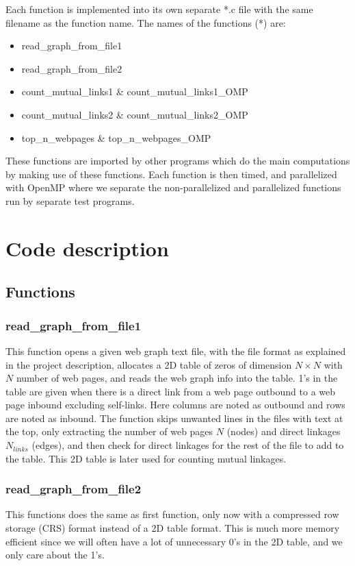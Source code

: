 \documentclass[12pt,a4paper,english]{article}
\begin{document}
Each function is implemented into its own separate *.c file with the same filename as the function name. The names of the functions (*) are:
\begin{itemize}
	\item read\_graph\_from\_file1
	\item read\_graph\_from\_file2
	\item count\_mutual\_links1 \& count\_mutual\_links1\_OMP
	\item count\_mutual\_links2 \& count\_mutual\_links2\_OMP
	\item top\_n\_webpages \& top\_n\_webpages\_OMP
\end{itemize}
These functions are imported by other programs which do the main computations by making use of these functions. Each function is then timed, and parallelized with OpenMP where we separate the non-parallelized and parallelized functions run by separate test programs.

\section{Code description}
\label{sect:Code_descr}
\subsection{Functions}
\label{subsect:Functions}
\subsubsection{read\_graph\_from\_file1}
This function opens a given web graph text file, with the file format as explained in the project description, allocates a 2D table of zeros of dimension $N\times N$ with $N$ number of web pages, and reads the web graph info into the table. 1's in the table are given when there is a direct link from a web page outbound to a web page inbound excluding self-links. Here columns are noted as outbound and rows are noted as inbound. The function skips unwanted lines in the files with text at the top, only extracting the number of web pages $N$ (nodes) and direct linkages $N_{links}$ (edges), and then check for direct linkages for the rest of the file to add to the table. This 2D table is later used for counting mutual linkages.

\subsubsection{read\_graph\_from\_file2}
This functions does the same as first function, only now with a compressed row storage (CRS) format instead of a 2D table format. This is much more memory efficient since we will often have a lot of unnecessary 0's in the 2D table, and we only care about the 1's. 
\end{document}
